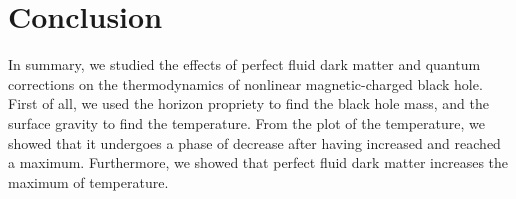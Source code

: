 \documentclass[10pt,letterpaper]{article}
\begin{document}
%
%
%
%
%


\section{Conclusion}

In summary, we studied the effects of perfect fluid dark matter and quantum corrections on the thermodynamics of nonlinear magnetic-charged black hole. First of all, we used the horizon propriety to find the black hole mass, and the surface gravity to find the temperature. From the plot of the temperature, we showed that it undergoes a phase of decrease after having increased and reached a maximum. Furthermore, we showed that perfect fluid dark matter increases the maximum of temperature.
\end{document}
